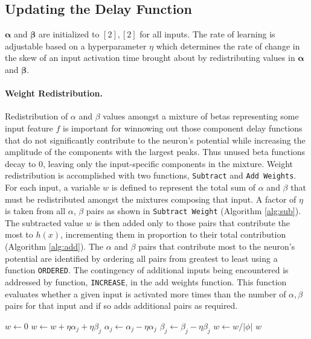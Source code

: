 \documentclass{article}
\begin{document}
\subsection*{Updating the Delay Function}
$\boldsymbol\alpha$ and $\boldsymbol\beta$ are initialized to $[2],[2]$ for all inputs. The rate of learning is adjustable based on a hyperparameter $\eta$ which determines the rate of change in the skew of an input activation time brought about by redistributing values in $\boldsymbol\alpha$ and $\boldsymbol\beta$. 

\paragraph{Weight Redistribution.}  Redistribution of $\alpha$ and $\beta$ values amongst a mixture of betas representing some input feature $f$ is important for winnowing out those component delay functions that do not significantly contribute to the neuron's potential while increasing the amplitude of the components with the largest peaks. Thus unused beta functions decay to 0, leaving only the input-specific components in the mixture. Weight redistribution is accomplished with two functions, \texttt{Subtract} and \texttt{Add Weights}. For each input, a variable $w$ is defined to represent the total sum of $\alpha$ and $\beta$ that must be redistributed amongst the mixtures composing that input.  A factor of $\eta$ is taken from all $\alpha$, $\beta$ pairs as shown in \texttt{Subtract Weight} (Algorithm \ref{alg:sub}).  The subtracted value $w$ is then added only to those pairs that contribute the most to $h(x)$, incrementing them in proportion to their total contribution (Algorithm \ref{alg:add}). The $\alpha$ and $\beta$ pairs that contribute most to the neuron's potential are identified by ordering all pairs from greatest to least using a function \texttt{ORDERED}. The contingency of additional inputs being encountered is addressed by function, \texttt{INCREASE}, in the add weights function.  This function evaluates whether a given input is activated more times than the number of $\alpha, \beta$ pairs for that input and if so adds additional pairs as required. 
\begin{algorithm}
\caption{Weight Subtraction}\label{alg:sub}
\begin{algorithmic}[1]
\State $w\gets 0 $
\State $w \gets w + \eta \alpha_j + \eta \beta_j$
\State $\alpha_j\gets \alpha_j - \eta \alpha_j$
\State $\beta_j\gets \beta_j - \eta \beta_j$
\EndFor
\EndFor
\State $w \gets w/|\phi|$
\State \Return $w$
\EndProcedure
\label{PC:SubW}
\end{algorithmic}
\end{algorithm}
\end{document}
